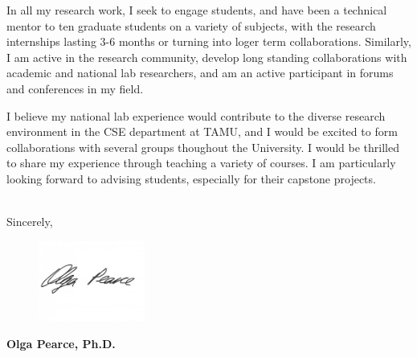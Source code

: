 \documentclass[10pt,letterpaper]{moderncv/moderncv}
\begin{document}
In all my research work, I seek to engage students, and have been a technical mentor to ten graduate students on
a variety of subjects, with the research internships lasting 3-6 months or turning into loger term collaborations.
Similarly, I am active in the research community, develop long standing collaborations with
academic and national lab researchers, and am an active participant in forums and conferences in my field.

I believe my national lab experience would contribute to the diverse research environment in the CSE department at TAMU,
and I would be excited to form collaborations with several groups thoughout the University.
I would be thrilled to share my experience through teaching a variety of courses.
I am particularly looking forward to advising students, especially for their capstone projects.





\ \\

Sincerely,

\begin{figure}[h]
\includegraphics[width=35mm]{Olga_signature.jpg}
\end{figure}


\textbf{Olga Pearce, Ph.D.}
\end{document}
